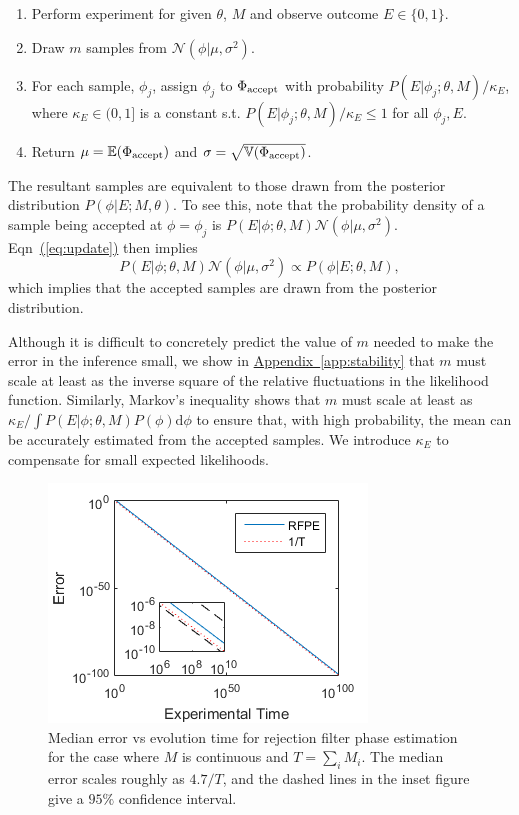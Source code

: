 \documentclass[aps,pra,amsmath,twocolumn,amssymb,superscriptaddress]{revtex4-1}
\newcommand{\eq}[1]{\hyperref[eq:#1]{(\ref*{eq:#1})}}
\newcommand{\app}[1]{\hyperref[app:#1]{Appendix~\ref*{app:#1}}}
\begin{document}
\begin{enumerate}
\item Perform experiment for given $\theta$, $M$ and observe outcome $E\in \{0,1\}$.
\item Draw $m$ samples from $\mathcal{N}(\phi|\mu,\sigma^2)$.
\item For each sample, $\phi_j$, assign $\phi_j$ to $\Phi_{\rm accept}$ with probability $P(E|\phi_j;\theta,M)/\kappa_E$, where $\kappa_E\in (0,1]$ is a constant s.t. $P(E|\phi_j;\theta,M)/\kappa_E\le 1$ for all $\phi_j,E$.
\item Return $\mu = \mathbb{E}(\Phi_{\rm accept})$ and $\sigma =\sqrt{\mathbb{V}(\Phi_{\rm accept})}$.
\end{enumerate}

The resultant samples are equivalent to those drawn from the posterior distribution
$P(\phi|E;M,\theta)$.  To see this, note that the probability density of a sample being accepted at $\phi=\phi_j$ is $ P(E | \phi; \theta, M) \mathcal{N}(\phi|\mu,\sigma^2)$.  Eqn~\eq{update} then implies 
\begin{equation}
    P(E | \phi; \theta, M) \mathcal{N}(\phi|\mu,\sigma^2) \propto P(\phi | E; \theta, M),
\end{equation}
which implies that the accepted samples are drawn from the posterior distribution.  

Although it is difficult to concretely predict the value of $m$ needed to make the error in the inference small, we show in \app{stability} that $m$ must scale at least as the inverse square of the relative fluctuations in the likelihood function.  Similarly, Markov's inequality shows that $m$ must scale at least as $\kappa_E/\int P(E|\phi;\theta,M)P(\phi) \mathrm{d}\phi$ to ensure that, with high probability, the mean can be accurately estimated from the accepted samples.  We introduce $\kappa_E$ to compensate for small expected likelihoods.

\begin{figure}[t!]
\includegraphics{Longpet2.png}
\caption{Median error vs evolution time for rejection filter phase estimation for the case where $M$ is continuous and $T=\sum_i M_i$.  The median error scales roughly as $4.7/T$, and the dashed lines in the inset figure give a $95\%$ confidence interval.}\label{fig:rms}
\end{figure}
\end{document}
